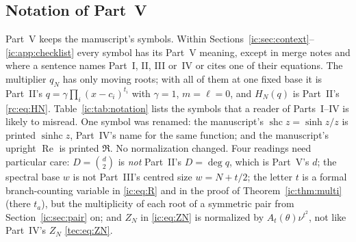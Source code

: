 \documentclass[11pt,a4paper]{article}
\numberwithin{equation}{section}
\theoremstyle{definition}
\theoremstyle{remark}
\newcommand{\sinhc}{\operatorname{sinhc}}
\begin{document}
\subsection{Notation of Part~V}\label{ic:sec:notation}
Part~V keeps the manuscript's symbols.  Within
Sections~\ref{ic:sec:context}--\ref{ic:app:checklist} every symbol has its
Part~V meaning, except in merge notes and where a sentence names Part~I, II,
III or~IV or cites one of their equations.  The multiplier $q_N$ has only
moving roots; with all of them at one fixed base it is Part~II's
$q=\gamma\prod_i(x-c_i)^{t_i}$ with $\gamma=1$, $m=\ell=0$, and $H_N(q)$ is
Part~II's \eqref{rc:eq:HN}.  Table~\ref{ic:tab:notation} lists the symbols
that a reader of Parts~I--IV is likely to misread.  One symbol was renamed:
the manuscript's $\operatorname{shc}z=\sinh z/z$ is printed $\sinhc z$,
Part~IV's name for the same function; and the manuscript's upright
$\operatorname{Re}$ is printed $\Re$.  No normalization changed.  Four
readings need particular care: $D=\binom d2$ is \emph{not} Part~II's
$D=\deg q$, which is Part~V's $d$; the spectral base $w$ is not Part~III's
centred size $w=N+t/2$; the letter $t$ is a formal branch-counting variable
in \eqref{ic:eq:R} and in the proof of Theorem~\ref{ic:thm:multi} (there
$t_a$), but the multiplicity of each root of a symmetric pair from
Section~\ref{ic:sec:pair} on; and $Z_N$ in \eqref{ic:eq:ZN} is normalized by
$A_t(\theta)\nu^{t^2}$, not like Part~IV's $Z_N$ \eqref{tec:eq:ZN}.
\end{document}
